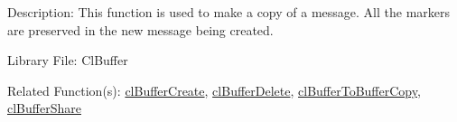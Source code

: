 \begin{Desc}
\item[Description:]This function is used to make a copy of a message. All the markers are preserved in the new message being created.\end{Desc}
\begin{Desc}
\item[Library File:]Cl\-Buffer\end{Desc}
\begin{Desc}
\item[Related Function(s):]\hyperlink{pagebuf103}{cl\-Buffer\-Create}, \hyperlink{pagebuf105}{cl\-Buffer\-Delete}, 
\hyperlink{pagebuf126}{cl\-Buffer\-To\-Buffer\-Copy}, \hyperlink{pagebuf128}{cl\-Buffer\-Share} \end{Desc}



\newpage
